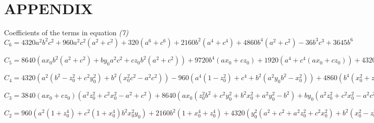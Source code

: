 \chapter{APPENDIX} %

\label{Appendix} %


Coefficients of the terms in equation \textit{(7)} \\

$C_6  = 4320a^2b^2c^2 + 960a^2c^2(a^2 + c^2) + 320(a^6 + c^6) + 2160b^2(a^4 + c^4) + 4860b^4(a^2 
+ c^2) - 36b^3c^3 + 3645b^6$
  
$C_5  = 8640(ax_0b^2(a^2 + c^2) + by_0a^2c^2  + cz_0b^2(a^2 + c^2)) + 9720b^4(ax_0 + cz_0) + 1920(a^4 
+ c^4(ax_0 + cz_0)) + 4320(a^4 + c^4by_0) + 3840(a^2 + c^2)(ax_0 + cz_0) + 19440(c^2b^2 + ab^2) 
by_0 -­ 108bc(c^2by_0 + cz_0b^2) -­ 320a^2ba^3 + 21870y_0b^5$  

$C_4  = 4320(a^2(b^2 - z_0^2 + c^2y_0^2) + b^2(x_0^2c^2 - a^2c^2)) -­ 960(a^4(1 -­ z_0^2) + c^4 + b^2(a^2y_0 ­ 
b^2 - x_0^2)) + 4860(b^4(x_0^2 + z_0^2 -­ 1)) + 4800(a^4x_0^2 + c4z_0^2)+ 2160y_0^2(a^4 + c^4) + 
5760a^2c^2(x_0^2 + z_0^2) + 7680ax_0cz_0(a^2 + c^2) + 17280((ax_0by_0 + by_0cz_0 )(a^2 + c^2) + 
ax_0cz_0b^2) + 12960b^2(a^4 x_0^2 + c^4z_0^2) + 29160b^2y_0^2(a^2 + c^2) -­ 108bc(b^2z_0^2 + c^2y_0^2)
- 1920a^2c^2 -­ 54675y_0^2b^4 -­ 324z_0c^2b^2y_0 - 640ax_0b^3$    

$C_3 = 3840(ax_0 + cz_0)(a^2z_0^2 + c^2x_0^2 - a^2 + c^2) + 8640(ax_0(z_0^2b^2 + c^2y_0^2 + b^2x_0^2 + 
a^2y_0^2 -­ b^2) + by_0(a^2z_0^2 + c^2x_0^2 - a^2c^2) + cz_0(a^2y_0^2 + b^2x_0^2 + bz_0^2 + c^2y_0^2 - ­ b^2)) + 6400 
(a^3x_0^3 + c^3z_0^3) + 19440by_0(b^2(x_0^2 + z_0^2 -­ 1) + y_0^2(a^2 + c^2)) -­ 36(b^3z_0^3 + c^3y_0^3 ) + 
11520(ax_0cz_0(ax_0 + cz_0))­ - 324by_0cz_0(bz_0 + c + y_0) + 25920by_0(z_0^2c^2 + x_0^2a^2) ­- 
320x_0^2b^3  + 72900y_0^3b^3 + 34560ax_0by_0cz_0 + 58320ax_0b^2y_0^2 -­ 1920ax_0b^2 - y_0 + 
58320cz_0b^2y_0  -­ 960a^2by_0^2$

$C_2 = 960(a^2(1 + z_0^4) +  c^2(1 + x_0^4)b^2x_0^2y_0) + 2160b^2(1 + x_0^4 + z_0^4) + 4320(y_0^2( 
a^2 + c^2 + a^2z_0^2 + c^2x_0^2) + b^2(x_0^2 - z_0^2 - x_0^2­ - z_0^2)) + 4800(x_0^3 - a^2 + z_0^3c^2)
 + 4860y_0^4(a^2 + c^2) + 5760(z_0^2c^2(1 + x_0^2) + x_0^2a^2(z0^2 - ­1)) + 7680ax_0cz_0(x_0^2 + z_0^2 - 1­ - 1920(a^2z_0^2 + c^2x_0^2 + ax_0y_0^2b) + 17280(by_0(ax_0^3 - ax_0 + cz_0^3 -­ cz_0 + az_0^2) + ax_0cz_0y_0^2) + 38880bz_0^3(ax_0 + cz_0) + 12960y_0^2(a^2x_0^2 ­ c^2z_0^2) + 
29160b^2y_0^2(x_0^2 + z_0^2 -­ 1) ­- 180y_0z_0c^2y_0^2 + b^2z_0^2) ­- 320a^2y_03 + 54675y_0^3b^2$  

